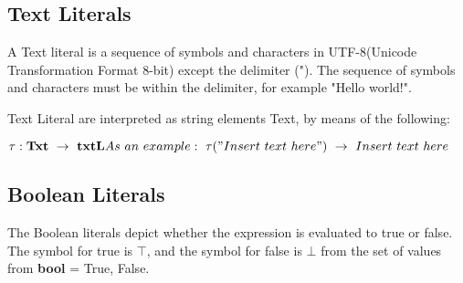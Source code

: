   
  \subsection{Text Literals}
  A Text literal is a sequence of symbols and characters in UTF-8(Unicode Transformation Format 8-bit) except the delimiter ("). The sequence of symbols and characters must be within the delimiter, for example "Hello world!". 
  
  
  Text Literal are interpreted as string elements Text, by means of the following:
  
  \begin{math}
  	\tau : \textbf{Txt} \ \rightarrow \ \textbf{txtL} \newline
  	As \ an \ example: \ \tau("Insert \ text \ here") \ \rightarrow \ Insert \ text \ here
  \end{math}
  
  \subsection{Boolean Literals}
  The Boolean literals depict whether the expression is evaluated to true or false. The symbol for true is \begin{math} \top \end{math}, and the symbol for false is \begin{math} \bot \end{math} from the set of values from \textbf{bool} = {True, False}.
  
  
  
  
